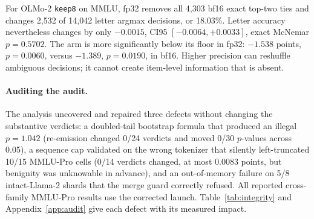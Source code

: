 For OLMo-2 \texttt{keep8} on MMLU, fp32 removes all 4,303 bf16 exact top-two ties and changes 2,532 of 14,042 letter argmax decisions, or 18.03\%. Letter accuracy nevertheless changes by only $-0.0015$, CI95 $[-0.0064,+0.0033]$, exact McNemar $p=0.5702$. The arm is more significantly below its floor in fp32: $-1.538$ points, $p=0.0060$, versus $-1.389$, $p=0.0190$, in bf16. Higher precision can reshuffle ambiguous decisions; it cannot create item-level information that is absent.

\paragraph{Auditing the audit.}
The analysis uncovered and repaired three defects without changing the substantive verdicts: a doubled-tail bootstrap formula that produced an illegal $p=1.042$ (re-emission changed 0/24 verdicts and moved 0/30 $p$-values across 0.05), a sequence cap validated on the wrong tokenizer that silently left-truncated 10/15 MMLU-Pro cells (0/14 verdicts changed, at most 0.0083 points, but benignity was unknowable in advance), and an out-of-memory failure on 5/8 intact-Llama-2 shards that the merge guard correctly refused. All reported cross-family MMLU-Pro results use the corrected launch. Table~\ref{tab:integrity} and Appendix~\ref{app:audit} give each defect with its measured impact.
